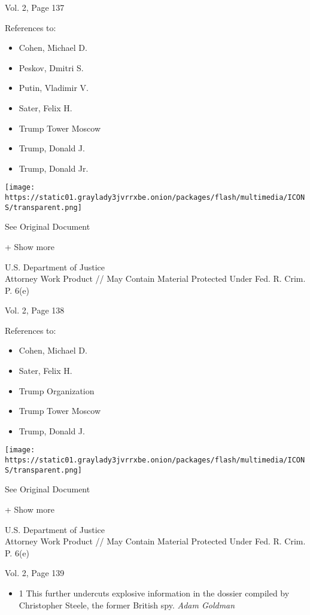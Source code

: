 Vol. 2, Page 137

References to:

\begin{itemize}
\tightlist
\item
  Cohen, Michael D.
\item
  Peskov, Dmitri S.
\item
  Putin, Vladimir V.
\item
  Sater, Felix H.
\item
  Trump Tower Moscow
\item
  Trump, Donald J.
\item
  Trump, Donald Jr.
\end{itemize}

\protect\hyperlink{}{}

\texttt{[image: https://static01.graylady3jvrrxbe.onion/packages/flash/multimedia/ICONS/transparent.png]}

See Original Document

+ Show more

U.S. Department of Justice\\
Attorney Work Product // May Contain Material Protected Under Fed. R.
Crim. P. 6(e)

Vol. 2, Page 138

References to:

\begin{itemize}
\tightlist
\item
  Cohen, Michael D.
\item
  Sater, Felix H.
\item
  Trump Organization
\item
  Trump Tower Moscow
\item
  Trump, Donald J.
\end{itemize}

\protect\hyperlink{}{}

\texttt{[image: https://static01.graylady3jvrrxbe.onion/packages/flash/multimedia/ICONS/transparent.png]}

See Original Document

+ Show more

U.S. Department of Justice\\
Attorney Work Product // May Contain Material Protected Under Fed. R.
Crim. P. 6(e)

Vol. 2, Page 139

\begin{itemize}
\tightlist
\item
  1 This further undercuts explosive information in the dossier compiled
  by Christopher Steele, the former British spy. \emph{Adam Goldman}
\end{itemize}

